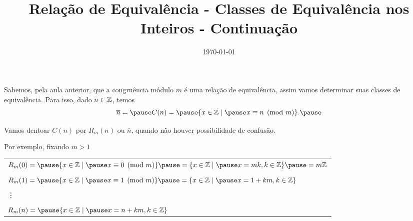\documentclass{beamer}
\title{Rela\c{c}\~ao de Equival\^encia - Classes de Equival\^encia nos Inteiros - Continua\c{c}\~ao}
\author[\autor]{\autor}
\institute[\instituto]{\instituto}
\date{\today}
\begin{document}
    \begin{frame}
        \maketitle
    \end{frame}


    \begin{frame}
        Sabemos, pela aula anterior, que a congru{\^e}ncia m{\'o}dulo $m$ {\'e} uma rela{\c c}{\~a}o de equival{\^e}ncia, \pause assim vamos determinar suas classes de equival{\^e}ncia. \pause Para isso, dado $n \in \mathbb{Z}$, temos\pause
        \[
            \overline{n} = \pause C(n) = \pause \{x \in \z \mid \pause x\equiv n \pmod{m}\}.\pause
        \]

        Vamos dentoar $C(n)$ \pause por $R_{m}(n)$ \pause ou $\overline{n}$, \pause quando n{\~a}o houver possibilidade de confus{\~a}o.\pause

        Por exemplo, fixando $m > 1$\pause
        \begin{center}
            \begin{tabular}{l}
                $R_{m}(0) = \pause \{x \in \z \mid \pause x\equiv 0 \pmod{m}\} \pause =\{x \in \z \mid \pause x = mk, k \in \z\}\pause = m\z$\pause\\
                \\
                $R_{m}(1) = \pause \{x \in \z \mid \pause x\equiv 1 \pmod{m}\} \pause = \{x \in \z \mid \pause x = 1 + km, k \in \z \}$\pause \\
                \\
                \vdots\\
                \\
                $R_{m}(n) = \pause \{x \in \z \mid \pause x = n + km, k \in \z \}$\pause    
            \end{tabular}
            
        \end{center}
    \end{frame}
\end{document}
